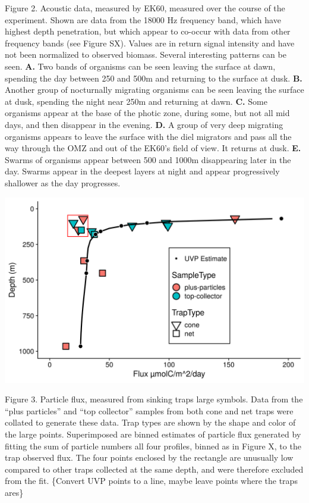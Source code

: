 \documentclass[]{article}
\begin{document}
Figure 2. Acoustic data, measured by EK60, measured over the course of
the experiment. Shown are data from the 18000 Hz frequency band, which
have highest depth penetration, but which appear to co-occur with data
from other frequency bands (see Figure SX). Values are in return signal
intensity and have not been normalized to observed biomass. Several
interesting patterns can be seen. \textbf{A.} Two bands of organisms can
be seen leaving the surface at dawn, spending the day between 250 and
500m and returning to the surface at dusk. \textbf{B.} Another group of
nocturnally migrating organisms can be seen leaving the surface at dusk,
spending the night near 250m and returning at dawn. \textbf{C.} Some
organisms appear at the base of the photic zone, during some, but not
all mid days, and then disappear in the evening. \textbf{D.} A group of
very deep migrating organisms appears to leave the surface with the diel
migrators and pass all the way through the OMZ and out of the EK60's
field of view. It returns at dusk. \textbf{E.} Swarms of organisms
appear between 500 and 1000m disappearing later in the day. Swarms
appear in the deepest layers at night and appear progressively shallower
as the day progresses.

\includegraphics{../figures/FittedFlux.png}

Figure 3. Particle flux, measured from sinking traps large symbols. Data
from the ``plus particles'' and ``top collector'' samples from both cone
and net traps were collated to generate these data. Trap types are shown
by the shape and color of the large points. Superimposed are binned
estimates of particle flux generated by fitting the sum of particle
numbers all four profiles, binned as in Figure X, to the trap observed
flux. The four points enclosed by the rectangle are unusually low
compared to other traps collected at the same depth, and were therefore
excluded from the fit. \{Convert UVP points to a line, maybe leave
points where the traps ares\}
\end{document}
